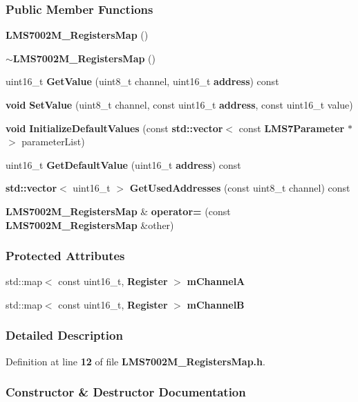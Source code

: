 \subsubsection*{Public Member Functions}
\begin{DoxyCompactItemize}
\item 
{\bf L\+M\+S7002\+M\+\_\+\+Registers\+Map} ()
\item 
{\bf $\sim$\+L\+M\+S7002\+M\+\_\+\+Registers\+Map} ()
\item 
uint16\+\_\+t {\bf Get\+Value} (uint8\+\_\+t channel, uint16\+\_\+t {\bf address}) const 
\item 
{\bf void} {\bf Set\+Value} (uint8\+\_\+t channel, const uint16\+\_\+t {\bf address}, const uint16\+\_\+t value)
\item 
{\bf void} {\bf Initialize\+Default\+Values} (const {\bf std\+::vector}$<$ const {\bf L\+M\+S7\+Parameter} $\ast$ $>$ parameter\+List)
\item 
uint16\+\_\+t {\bf Get\+Default\+Value} (uint16\+\_\+t {\bf address}) const 
\item 
{\bf std\+::vector}$<$ uint16\+\_\+t $>$ {\bf Get\+Used\+Addresses} (const uint8\+\_\+t channel) const 
\item 
{\bf L\+M\+S7002\+M\+\_\+\+Registers\+Map} \& {\bf operator=} (const {\bf L\+M\+S7002\+M\+\_\+\+Registers\+Map} \&other)
\end{DoxyCompactItemize}
\subsubsection*{Protected Attributes}
\begin{DoxyCompactItemize}
\item 
std\+::map$<$ const uint16\+\_\+t, {\bf Register} $>$ {\bf m\+ChannelA}
\item 
std\+::map$<$ const uint16\+\_\+t, {\bf Register} $>$ {\bf m\+ChannelB}
\end{DoxyCompactItemize}


\subsubsection{Detailed Description}


Definition at line {\bf 12} of file {\bf L\+M\+S7002\+M\+\_\+\+Registers\+Map.\+h}.



\subsubsection{Constructor \& Destructor Documentation}
